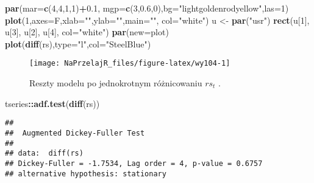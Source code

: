 \documentclass[polish,]{book}
\newenvironment{Shaded}{\begin{snugshade}}{\end{snugshade}}
\newcommand{\DataTypeTok}[1]{\textcolor[rgb]{0.13,0.29,0.53}{#1}}
\newcommand{\DecValTok}[1]{\textcolor[rgb]{0.00,0.00,0.81}{#1}}
\newcommand{\FloatTok}[1]{\textcolor[rgb]{0.00,0.00,0.81}{#1}}
\newcommand{\KeywordTok}[1]{\textcolor[rgb]{0.13,0.29,0.53}{\textbf{#1}}}
\newcommand{\NormalTok}[1]{#1}
\newcommand{\OperatorTok}[1]{\textcolor[rgb]{0.81,0.36,0.00}{\textbf{#1}}}
\newcommand{\StringTok}[1]{\textcolor[rgb]{0.31,0.60,0.02}{#1}}
\begin{document}
\begin{Shaded}
\begin{Highlighting}[]
\KeywordTok{par}\NormalTok{(}\DataTypeTok{mar=}\KeywordTok{c}\NormalTok{(}\DecValTok{4}\NormalTok{,}\DecValTok{4}\NormalTok{,}\DecValTok{1}\NormalTok{,}\DecValTok{1}\NormalTok{)}\OperatorTok{+}\FloatTok{0.1}\NormalTok{, }\DataTypeTok{mgp=}\KeywordTok{c}\NormalTok{(}\DecValTok{3}\NormalTok{,}\FloatTok{0.6}\NormalTok{,}\DecValTok{0}\NormalTok{),}\DataTypeTok{bg=}\StringTok{"lightgoldenrodyellow"}\NormalTok{,}\DataTypeTok{las=}\DecValTok{1}\NormalTok{)}
\KeywordTok{plot}\NormalTok{(}\DecValTok{1}\NormalTok{,}\DataTypeTok{axes=}\NormalTok{F,}\DataTypeTok{xlab=}\StringTok{""}\NormalTok{,}\DataTypeTok{ylab=}\StringTok{""}\NormalTok{,}\DataTypeTok{main=}\StringTok{""}\NormalTok{, }\DataTypeTok{col=}\StringTok{"white"}\NormalTok{)}
\NormalTok{u <-}\StringTok{ }\KeywordTok{par}\NormalTok{(}\StringTok{"usr"}\NormalTok{)}
\KeywordTok{rect}\NormalTok{(u[}\DecValTok{1}\NormalTok{], u[}\DecValTok{3}\NormalTok{], u[}\DecValTok{2}\NormalTok{], u[}\DecValTok{4}\NormalTok{], }\DataTypeTok{col=}\StringTok{"white"}\NormalTok{)}
\KeywordTok{par}\NormalTok{(}\DataTypeTok{new=}\NormalTok{plot)}
\KeywordTok{plot}\NormalTok{(}\KeywordTok{diff}\NormalTok{(rs),}\DataTypeTok{type=}\StringTok{"l"}\NormalTok{,}\DataTypeTok{col=}\StringTok{"SteelBlue"}\NormalTok{)}
\end{Highlighting}
\end{Shaded}

\begin{figure}[h]

{\centering \texttt{[image: NaPrzelajR\_files/figure-latex/wy104-1]} 

}

\caption{Reszty modelu po jednokrotnym różnicowaniu $rs_t$ .}\label{fig:wy104}
\end{figure}

\begin{Shaded}
\begin{Highlighting}[]
\NormalTok{tseries}\OperatorTok{::}\KeywordTok{adf.test}\NormalTok{(}\KeywordTok{diff}\NormalTok{(rs))}
\end{Highlighting}
\end{Shaded}

\begin{verbatim}
## 
##  Augmented Dickey-Fuller Test
## 
## data:  diff(rs)
## Dickey-Fuller = -1.7534, Lag order = 4, p-value = 0.6757
## alternative hypothesis: stationary
\end{verbatim}
\end{document}
